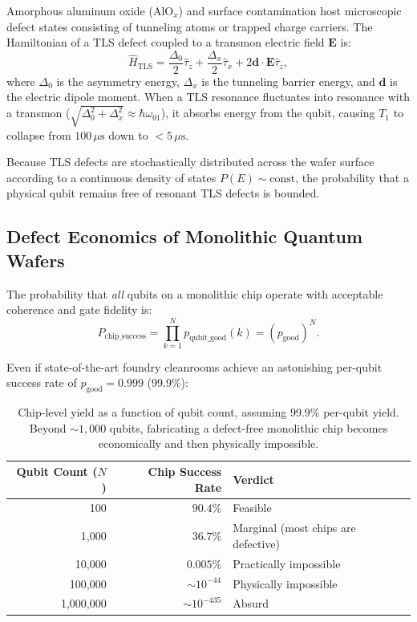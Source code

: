 Amorphous aluminum oxide ($\text{AlO}_x$) and surface contamination host microscopic  defect states consisting of tunneling atoms or trapped charge carriers. The Hamiltonian of a TLS defect coupled to a transmon electric field $\bm{E}$ is:
\begin{equation}
    \hat{H}_{\text{TLS}} = \frac{\Delta_0}{2} \hat{\tau}_z + \frac{\Delta_x}{2} \hat{\tau}_x + 2 \bm{d} \cdot \bm{E} \hat{\tau}_z,
    \label{eq:tls_hamiltonian}
\end{equation}
where $\Delta_0$ is the asymmetry energy, $\Delta_x$ is the tunneling barrier energy, and $\bm{d}$ is the electric dipole moment. When a TLS resonance fluctuates into resonance with a transmon ($\sqrt{\Delta_0^2 + \Delta_x^2} \approx \hbar \omega_{01}$), it absorbs energy from the qubit, causing $T_1$ to collapse from $100\,\mu\text{s}$ down to $<5\,\mu\text{s}$.

Because TLS defects are stochastically distributed across the wafer surface according to a continuous density of states $P(E) \sim \text{const}$, the probability that a physical qubit remains free of resonant TLS defects is bounded.

\subsection{Defect Economics of Monolithic Quantum Wafers}
The probability that \textit{all} qubits on a monolithic chip operate with acceptable coherence and gate fidelity is:
\begin{equation}
    P_{\text{chip\_success}} = \prod_{k=1}^{N} p_{\text{qubit\_good}}(k) = (p_{\text{good}})^N.
    \label{eq:chip_yield_product}
\end{equation}

Even if state-of-the-art foundry cleanrooms achieve an astonishing per-qubit success rate of $p_{\text{good}} = 0.999$ (99.9\%):

\begin{table}[htbp]
\centering
\begin{tabular}{r r l}
\toprule
\textbf{Qubit Count ($N$)} & \textbf{Chip Success Rate} & \textbf{Verdict} \\
\midrule
100 & $90.4\%$ & Feasible \\
1,000 & $36.7\%$ & Marginal (most chips are defective) \\
10,000 & $0.005\%$ & Practically impossible \\
100,000 & $\sim 10^{-44}$ & Physically impossible \\
1,000,000 & $\sim 10^{-435}$ & Absurd \\
\bottomrule
\end{tabular}
\caption{Chip-level yield as a function of qubit count, assuming 99.9\% per-qubit yield. Beyond $\sim 1{,}000$ qubits, fabricating a defect-free monolithic chip becomes economically and then physically impossible.}
\label{tab:yield_scaling}
\end{table}

